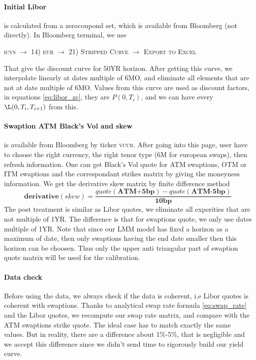 \documentclass[a4paper,10pt]{article}
\newcommand{\bl}[1]{{\scshape  #1}}
\begin{document}
\paragraph{Initial Libor} is calculated from a zerocoupond set, which is available from Bloomberg (not directly). In Bloomberg terminal, we use 
\begin{center}
\bl{icvs} $\longrightarrow$ \bl{14) eur} $\longrightarrow$ \bl{21) Stripped Curve} $\longrightarrow$  \bl{Export to Excel} 
\end{center}
That give the discount curve for 50YR horizon. After getting this curve, we interpolate linearly at dates multiple of 6MO, and eliminate all elements that are not at date multiple of 6MO. Values from this curve are used as discount factors, in equations \ref{eq:libor_zc}, they are $P(0,T_{i})$, and we can have every $\L(0,T_{i},T_{i+1})$ from this. 
\paragraph{Swaption ATM Black's Vol and skew} is available from Bloomberg by ticker \bl{vcub}. After going into this page, user have to choose the right currency, the right tenor type (6M for european swaps), then refresh information. One can get Black's Vol quote for ATM swaptions, OTM or ITM swaptions and the correspondant strikes matrix by giving the moneyness information. We get the derivative skew matrix by finite difference method
\[
\textbf{derivative}(skew) = \frac{quote (\textbf{ATM+5bp}) - quote(\textbf{ATM-5bp}) }{\textbf{10bp}}
\]
The post treatment is similar as Libor quotes, we eliminate all experities that are not multiple of 1YR. The difference is that for swaptions quote, we only use dates multiple of 1YR. Note that since our LMM model has fixed a horizon as a maximum of date, then only swaptions having the end date smaller then this horizon can be choosen. Thus only the upper anti triangular part of swaption quote matrix will be used for the calibration.
\paragraph{Data check}
Before using the data, we always check if the data is coherent, i.e Libor quotes is coherent with swaptions. Thanks to analytical swap rate formula \ref{eq:swap_rate} and the Libor quotes, we recompute our swap rate matrix, and compare with the ATM swaptions strike quote. The ideal case has to match exactly the same values. But in reality, there are a difference about 1\%-5\%, that is negligible and we accept this difference since we didn't send time to rigorously build our yield curve.    
\end{document}
